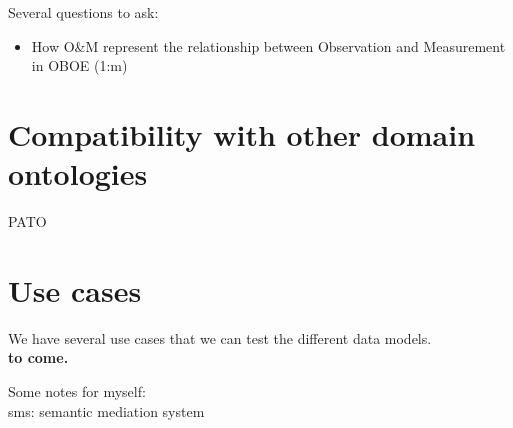 \documentclass{article}
\begin{document}
Several questions to ask:
\begin{itemize}
\item How O\&M represent the relationship between Observation and Measurement in OBOE (1:m)
\end{itemize}

\section{Compatibility with other domain ontologies}
PATO  
\section{Use cases}
We have several use cases that we can test the different data models. \\
{\bf to come. }

Some notes for myself: \\
sms: semantic mediation system





\end{document}
